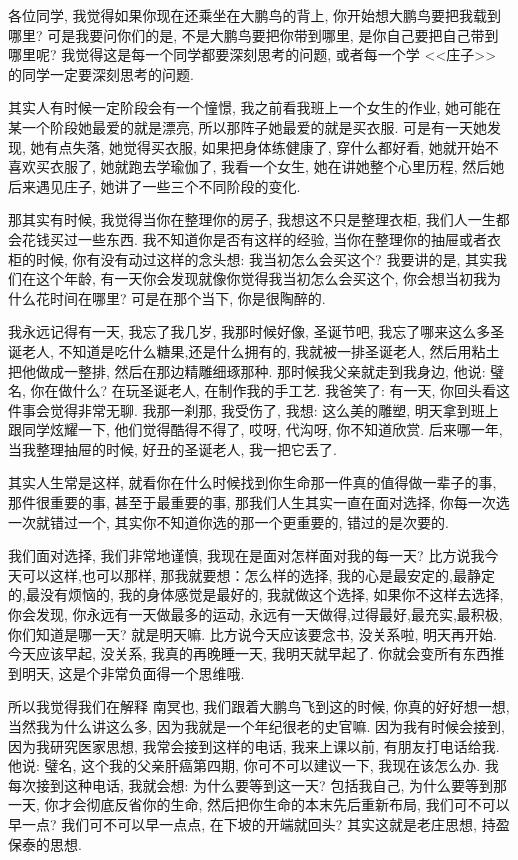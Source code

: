 \documentclass[11pt]{article}
\begin{document}
各位同学, 我觉得如果你现在还乘坐在大鹏鸟的背上, 你开始想大鹏鸟要把我载到哪里? 可是我要问你们的是, 不是大鹏鸟要把你带到哪里, 是你自己要把自己带到哪里呢? 我觉得这是每一个同学都要深刻思考的问题, 或者每一个学 <<庄子>> 的同学一定要深刻思考的问题. 

其实人有时候一定阶段会有一个憧憬, 我之前看我班上一个女生的作业, 她可能在某一个阶段她最爱的就是漂亮, 所以那阵子她最爱的就是买衣服. 可是有一天她发现, 她有点失落, 她觉得买衣服, 如果把身体练健康了, 穿什么都好看, 她就开始不喜欢买衣服了, 她就跑去学瑜伽了, 我看一个女生, 她在讲她整个心里历程, 然后她后来遇见庄子, 她讲了一些三个不同阶段的变化.

那其实有时候, 我觉得当你在整理你的房子, 我想这不只是整理衣柜, 我们人一生都会花钱买过一些东西. 我不知道你是否有这样的经验, 当你在整理你的抽屉或者衣柜的时候, 你有没有动过这样的念头想: 我当初怎么会买这个? 我要讲的是, 其实我们在这个年龄, 有一天你会发现就像你觉得我当初怎么会买这个, 你会想当初我为什么花时间在哪里? 可是在那个当下, 你是很陶醉的.

我永远记得有一天, 我忘了我几岁, 我那时候好像, 圣诞节吧, 我忘了哪来这么多圣诞老人, 不知道是吃什么糖果,还是什么拥有的, 我就被一排圣诞老人, 然后用粘土把他做成一整排, 然后在那边精雕细琢那种. 那时候我父亲就走到我身边, 他说: 璧名, 你在做什么? 在玩圣诞老人, 在制作我的手工艺. 我爸笑了: 有一天, 你回头看这件事会觉得非常无聊. 我那一刹那, 我受伤了, 我想: 这么美的雕塑, 明天拿到班上跟同学炫耀一下, 他们觉得酷得不得了, 哎呀, 代沟呀, 你不知道欣赏. 后来哪一年, 当我整理抽屉的时候, 好丑的圣诞老人, 我一把它丢了.

其实人生常是这样, 就看你在什么时候找到你生命那一件真的值得做一辈子的事, 那件很重要的事, 甚至于最重要的事, 那我们人生其实一直在面对选择, 你每一次选一次就错过一个, 其实你不知道你选的那一个更重要的, 错过的是次要的. 

我们面对选择, 我们非常地谨慎, 我现在是面对怎样面对我的每一天? 比方说我今天可以这样,也可以那样, 那我就要想：怎么样的选择, 我的心是最安定的,最静定的,最没有烦恼的, 我的身体感觉是最好的, 我就做这个选择, 如果你不这样去选择, 你会发现, 你永远有一天做最多的运动, 永远有一天做得,过得最好,最充实,最积极, 你们知道是哪一天? 就是明天嘛. 比方说今天应该要念书, 没关系啦, 明天再开始. 今天应该早起, 没关系, 我真的再晚睡一天, 我明天就早起了. 你就会变所有东西推到明天, 这是个非常负面得一个思维哦. 

所以我觉得我们在解释{\color{blue} 南冥也}, 我们跟着大鹏鸟飞到这的时候, 你真的好好想一想, 当然我为什么讲这么多, 因为我就是一个年纪很老的史官嘛. 因为我有时候会接到, 因为我研究医家思想, 我常会接到这样的电话, 我来上课以前, 有朋友打电话给我. 他说: 璧名, 这个我的父亲肝癌第四期, 你可不可以建议一下, 我现在该怎么办. 我每次接到这种电话, 我就会想: 为什么要等到这一天? 包括我自己, 为什么要等到那一天, 你才会彻底反省你的生命, 然后把你生命的本末先后重新布局, 我们可不可以早一点? 我们可不可以早一点点, 在下坡的开端就回头? 其实这就是老庄思想, 持盈保泰的思想.
\end{document}
